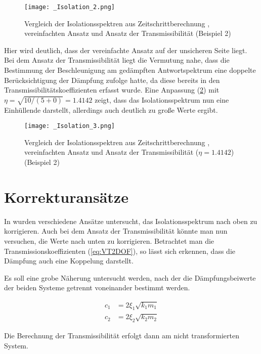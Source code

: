 \begin{figure}[H]
    \centering
    \texttt{[image: \_Isolation\_2.png]}
    \caption{Vergleich der Isolationsspektren aus Zeitschrittberechnung \cite{Isemann}, vereinfachten Ansatz und Ansatz der Transmissibilität (Beispiel 2)}
    \label{fig:Isolation}
\end{figure}

Hier wird deutlich, dass der vereinfachte Ansatz auf der unsicheren Seite liegt.
Bei dem Ansatz der Transmissibilität liegt die Vermutung nahe, dass die Bestimmung der Beschleunigung am gedämpften Antwortspektrum eine doppelte Berücksichtigung der Dämpfung zufolge hatte, da diese bereits in den Transmissibilitätskoeffizienten erfasst wurde.
Eine Anpassung (\cref{fig:Isolation2}) mit $\eta = \sqrt{10/(5+0)} = 1.4142$ zeigt, dass das Isolationsspektrum nun eine Einhüllende darstellt, allerdings auch deutlich zu große Werte ergibt.

\begin{figure}[H]
    \centering
    \texttt{[image: \_Isolation\_3.png]}
    \caption{Vergleich der Isolationsspektren aus Zeitschrittberechnung \cite{Isemann}, vereinfachten Ansatz und Ansatz der Transmissibilität ($\eta = 1.4142$) (Beispiel 2)}
    \label{fig:Isolation2}
\end{figure}

\section{Korrekturansätze}
\label{sec:Korrekturansaetze}

In \cite{Isemann} wurden verschiedene Ansätze untersucht, das Isolationsspektrum nach oben zu korrigieren.
Auch bei dem Ansatz der Transmissibilität könnte man nun versuchen, die Werte nach unten zu korrigieren. Betrachtet man die Transmissionskoeffizienten (\cref{eq:VT2DOF}), so lässt sich erkennen, dass die Dämpfung auch eine Koppelung darstellt. 

Es soll eine grobe Näherung untersucht werden, nach der die Dämpfungsbeiwerte der beiden Systeme getrennt voneinander bestimmt werden.

\begin{align*}
c_1 &= 2 \xi_1 \sqrt{k_1 m_1}\\
c_2 &= 2 \xi_2 \sqrt{k_2 m_2}
\end{align*}

Die Berechnung der Transmissibilität erfolgt dann am nicht transformierten System.


